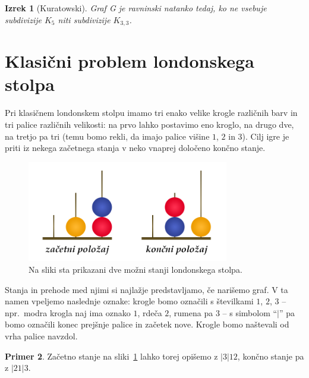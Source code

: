\documentclass[12pt,a4paper]{amsart}
\theoremstyle{definition} %
\newtheorem{definicija}{Definicija}[section]
\newtheorem{primer}[definicija]{Primer}
\theoremstyle{plain} %
\newtheorem{izrek}[definicija]{Izrek}
\newcommand{\N}{\mathbb N}
\newcommand{\graf}[1][G]{\ensuremath{#1 = (V(#1), E(#1))}}
\newcommand{\vozlisca}[1][G]{\ensuremath{V(#1)}}
\newcommand{\povezave}[1][G]{\ensuremath{E(#1)}}
\begin{document}
\begin{izrek}[Kuratowski]
    \label{izr:kuratowski}
    Graf G je ravninski natanko tedaj, ko ne vsebuje subdivizije $K_5$ niti subdivizije $K_{3,3}$.
\end{izrek}

\section{Klasični problem londonskega stolpa}
Pri klasičnem londonskem stolpu imamo tri enako velike krogle različnih barv in tri palice različnih velikosti: na prvo lahko postavimo eno kroglo, na drugo dve, na tretjo pa tri (temu bomo rekli, da imajo palice višine $1$, $2$ in $3$). Cilj igre je priti iz nekega začetnega stanja v neko vnaprej določeno končno stanje.

\begin{figure}[h]
    \includegraphics[width=250pt]{img/london-tower.png}
    \caption{Na sliki sta prikazani dve možni stanji londonskega stolpa.}
    \label{fig:stanji}
\end{figure}

Stanja in prehode med njimi si najlažje predstavljamo, če narišemo graf. V ta namen vpeljemo naslednje oznake:
krogle bomo označili s številkami $1$, $2$, $3$ -- npr.\ modra krogla naj ima oznako $1$, rdeča $2$, rumena pa $3$ -- s simbolom ``$|$'' pa bomo označili konec prejšnje palice in začetek nove. Krogle bomo naštevali od vrha palice navzdol.

\begin{primer}
    Začetno stanje na sliki~\ref{fig:stanji} lahko torej opišemo z $|3|12$, končno stanje pa z $|21|3$.
\end{primer}
\medskip
\end{document}
